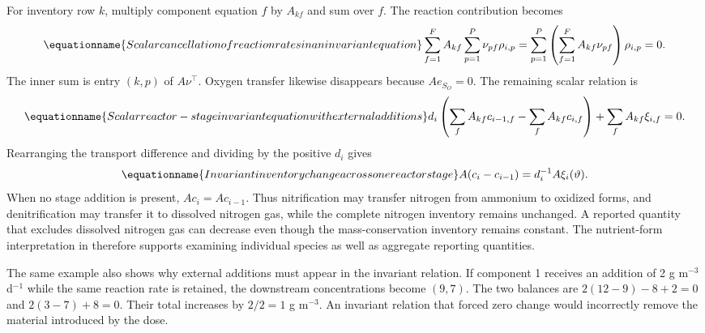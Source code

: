 For inventory row $k$, multiply component equation $f$ by $A_{kf}$ and sum over $f$. The reaction contribution becomes
\begin{equation}
\equationname{Scalar cancellation of reaction rates in an invariant equation}
\sum_{f=1}^{F}A_{kf}\sum_{p=1}^{P}\nu_{pf}\rho_{i,p}
=\sum_{p=1}^{P}\left(\sum_{f=1}^{F}A_{kf}\nu_{pf}\right)\rho_{i,p}=0.
\end{equation}
The inner sum is entry $(k,p)$ of $A\nu^\top$. Oxygen transfer likewise disappears because $Ae_{S_O}=0$. The remaining scalar relation is
\begin{equation}
\equationname{Scalar reactor-stage invariant equation with external additions}
d_i\left(\sum_fA_{kf}c_{i-1,f}-\sum_fA_{kf}c_{i,f}\right)
+\sum_fA_{kf}\xi_{i,f}=0.
\end{equation}
Rearranging the transport difference and dividing by the positive $d_i$ gives
\begin{equation}
\equationname{Invariant inventory change across one reactor stage}
A(c_i-c_{i-1})=d_i^{-1}A\xi_i(\vartheta).
\label{eq:plant_invariant_transition}
\end{equation}
When no stage addition is present, $Ac_i=Ac_{i-1}$. Thus nitrification may transfer nitrogen from ammonium to oxidized forms, and denitrification may transfer it to dissolved nitrogen gas, while the complete nitrogen inventory remains unchanged. A reported quantity that excludes dissolved nitrogen gas can decrease even though the mass-conservation inventory remains constant. The nutrient-form interpretation in \citet{USEPA2009} therefore supports examining individual species as well as aggregate reporting quantities.

The same example also shows why external additions must appear in the invariant relation. If component 1 receives an addition of 2 g m$^{-3}$ d$^{-1}$ while the same reaction rate is retained, the downstream concentrations become $(9,7)$. The two balances are $2(12-9)-8+2=0$ and $2(3-7)+8=0$. Their total increases by $2/2=1$ g m$^{-3}$. An invariant relation that forced zero change would incorrectly remove the material introduced by the dose.

